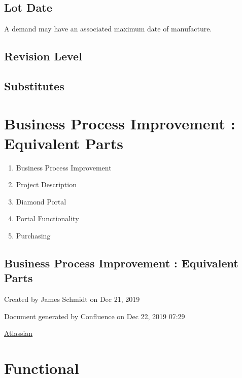 \documentclass[letterpaper,10pt,english]{sphinxmanual}
\begin{document}
\section{Lot Date}
\label{APS/EligibilityTests:id13}
A demand may have an associated maximum date of manufacture.


\section{Revision Level}
\label{APS/EligibilityTests:id14}

\section{Substitutes}
\label{APS/EligibilityTests:id15}

\chapter{Business Process Improvement : Equivalent Parts}
\label{APS/Equivalent-Parts::doc}\label{APS/Equivalent-Parts:business-process-improvement-equivalent-parts}\begin{enumerate}
\item {} 
Business Process Improvement

\item {} 
Project Description

\item {} 
Diamond Portal

\item {} 
Portal Functionality

\item {} 
Purchasing

\end{enumerate}


\section{Business Process Improvement : Equivalent Parts}
\label{APS/Equivalent-Parts:id1}
Created by James Schmidt on Dec 21, 2019

Document generated by Confluence on Dec 22, 2019 07:29

\href{http://www.atlassian.com/}{Atlassian}


\chapter{Functional}
\label{APS/Functional::doc}\label{APS/Functional:functional}
\end{document}

